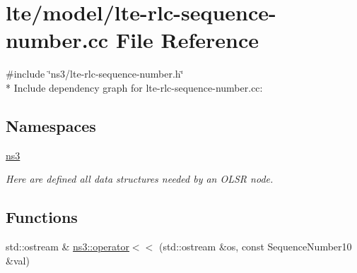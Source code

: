 \hypertarget{lte-rlc-sequence-number_8cc}{}\section{lte/model/lte-\/rlc-\/sequence-\/number.cc File Reference}
\label{lte-rlc-sequence-number_8cc}
{\ttfamily \#include \char`\"{}ns3/lte-\/rlc-\/sequence-\/number.\+h\char`\"{}}\\*
Include dependency graph for lte-\/rlc-\/sequence-\/number.cc\+:
\subsection*{Namespaces}
\begin{DoxyCompactItemize}
\item 
 \hyperlink{namespacens3}{ns3}
\begin{DoxyCompactList}\small\item\em Here are defined all data structures needed by an O\+L\+SR node. \end{DoxyCompactList}\end{DoxyCompactItemize}
\subsection*{Functions}
\begin{DoxyCompactItemize}
\item 
std\+::ostream \& \hyperlink{namespacens3_a8a1006e0a636213e9270b9f9b7f0daa4}{ns3\+::operator$<$$<$} (std\+::ostream \&os, const Sequence\+Number10 \&val)
\end{DoxyCompactItemize}
